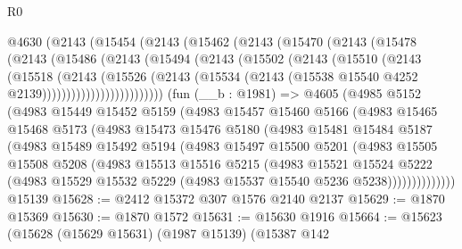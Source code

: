 \begin{lexlean}{R0}
\begin{coremodule}
    @4630
      (@2143
        (@15454
          (@2143
            (@15462
              (@2143
                (@15470
                  (@2143
                    (@15478
                      (@2143
                        (@15486
                          (@2143
                            (@15494
                              (@2143
                                (@15502
                                  (@2143
                                    (@15510
                                      (@2143
                                        (@15518
                                          (@2143
                                            (@15526
                                              (@2143
                                                (@15534
                                                  (@2143
                                                    (@15538
                                                      @15540
                                                      @4252
                                                      @2139)))))))))))))))))))))))))
    (fun (__b : @1981) =>
    @4605
      (@4985
        @5152
        (@4983
          @15449
          @15452
          @5159
          (@4983
            @15457
            @15460
            @5166
            (@4983
              @15465
              @15468
              @5173
              (@4983
                @15473
                @15476
                @5180
                (@4983
                  @15481
                  @15484
                  @5187
                  (@4983
                    @15489
                    @15492
                    @5194
                    (@4983
                      @15497
                      @15500
                      @5201
                      (@4983
                        @15505
                        @15508
                        @5208
                        (@4983
                          @15513
                          @15516
                          @5215
                          (@4983
                            @15521
                            @15524
                            @5222
                            (@4983
                              @15529
                              @15532
                              @5229
                              (@4983 @15537 @15540 @5236 @5238))))))))))))))
    @15139
@15628 := @2412 @15372 @307 @1576 @2140 @2137
@15629 := @1870 @15369
@15630 := @1870 @1572
@15631 := @15630 @1916
@15664 := @15623
    (@15628
      (@15629 @15631)
      (@1987 @15139)
      (@15387
        @142

\end{coremodule}
\end{lexlean}
